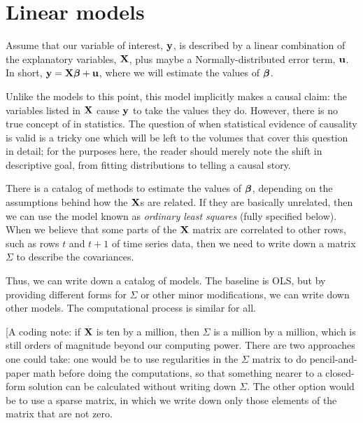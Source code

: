 



\section{Linear models}
\label{cat}

Assume that our variable of interest, ${\bf y}$, is
described by a linear combination of the explanatory variables, ${\bf X}$,
plus maybe a Normally-distributed error term, ${\bf u}$. In short,
${\bf y}={\bf X}{\mbox{\boldmath$\beta$}} + {\bf u}$, where we will estimate the values of ${\mbox{\boldmath$\beta$}}$. 

Unlike the models to this point, this model implicitly makes a
causal claim: the variables listed in ${\bf X}$ cause ${\bf y}$ to take the values they
do. However, 
there is no true concept of  in statistics.
The question of when statistical evidence of causality is valid is a tricky
one which will be left to the volumes that cover this question in
detail; for the purposes here, the reader should merely note the shift in
descriptive goal, from fitting distributions to telling a causal story.

There is a catalog of methods to estimate the values of ${\mbox{\boldmath$\beta$}}$,
depending on the assumptions behind how the ${\bf X}$s are related. If they
are basically unrelated, then we can use the model known as {\em ordinary
least squares} (fully specified below). When we believe that some parts
of the ${\bf X}$ matrix are correlated to other rows, such as rows $t$ and
$t+1$ of 
time series data, then we need to write down a matrix
$\Sigma$ to describe the covariances.

Thus, we can write down a catalog of models. The baseline is OLS, but by
providing different forms for $\Sigma$ or other minor modifications, we
can write down other models. The computational process is similar
for all.

[A coding note: if ${\bf X}$ is ten by a million, then $\Sigma$ is a million
by a million, which is still orders of magnitude beyond our computing
power. There are two approaches one could take: one would be to use
regularities in the $\Sigma$ matrix to do pencil-and-paper math before
doing the computations, so that something nearer to a closed-form
solution can be calculated without writing down $\Sigma$. The other
option would be to use a sparse matrix, in which
we write down only those elements of the matrix that are not zero. 

